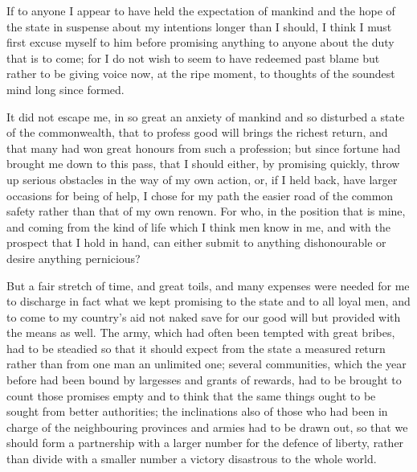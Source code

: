 

 If to anyone I appear to have held the expectation of mankind and the hope of the state in suspense about my intentions longer than I should, I think I must first excuse myself to him before promising anything to anyone about the duty that is to come; for I do not wish to seem to have redeemed past blame but rather to be giving voice now, at the ripe moment, to thoughts of the soundest mind long since formed.

 It did not escape me, in so great an anxiety of mankind and so disturbed a state of the commonwealth, that to profess good will brings the richest return, and that many had won great honours from such a profession; but since fortune had brought me down to this pass, that I should either, by promising quickly, throw up serious obstacles in the way of my own action, or, if I held back, have larger occasions for being of help, I chose for my path the easier road of the common safety rather than that of my own renown. For who, in the position that is mine, and coming from the kind of life which I think men know in me, and with the prospect that I hold in hand, can either submit to anything dishonourable or desire anything pernicious?

 But a fair stretch of time, and great toils, and many expenses were needed for me to discharge in fact what we kept promising to the state and to all loyal men, and to come to my country's aid not naked save for our good will but provided with the means as well. The army, which had often been tempted with great bribes, had to be steadied so that it should expect from the state a measured return rather than from one man an unlimited one; several communities, which the year before had been bound by largesses and grants of rewards, had to be brought to count those promises empty and to think that the same things ought to be sought from better authorities; the inclinations also of those who had been in charge of the neighbouring provinces and armies had to be drawn out, so that we should form a partnership with a larger number for the defence of liberty, rather than divide with a smaller number a victory disastrous to the whole world.

